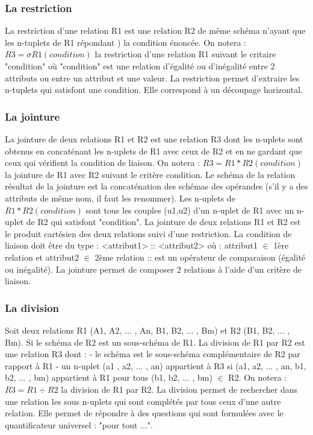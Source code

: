 \documentclass[12pt, a4paper, oneside, titlepage]{book}%
\begin{document}
\subsubsection{La restriction}
La restriction d'une relation R1 est une relation R2 de même schéma n'ayant que les n-tuplets de R1 répondant ) la condition énoncée.
On notera : $R3 = \sigma R1 (condition)$ la restriction d'une relation R1 suivant le critaire "condition" où "condition" est une relation d'égalité ou d'inégalité entre 2 attributs ou entre un attribut et une valeur.
La restriction permet d'extraire les n-tuplets qui satisfont une condition. Elle correspond à un découpage horizontal.

\subsubsection{La jointure}
La jointure de deux relations R1 et R2 est une relation R3 dont les n-uplets sont obtenus en concaténant les n-uplets de R1 avec ceux de R2 et en ne gardant que ceux qui vérifient la condition de liaison.
On notera : $R3 = R1 \ast  R2 (condition)$ la jointure de R1 avec R2 suivant le critère condition. Le schéma de la relation résultat de la jointure est la concaténation des schémas des opérandes (s'il y a des attributs de même nom, il faut les renommer).  Les n-uplets de $R1 \ast R2 (condition)$ sont tous les couples (u1,u2) d'un n-uplet de R1 avec un n-uplet de R2 qui satisfont "condition". La jointure de deux relations R1 et R2 est le produit cartésien des deux relations suivi d'une restriction. La condition de liaison doit être du type : <attribut1>  ::  <attribut2> où :  attribut1 $\in$ 1ère relation et attribut2 $\in$ 2ème relation :: est un opérateur de comparaison (égalité ou inégalité). La jointure permet de composer 2 relations à l'aide d'un critère de liaison.


\subsubsection{La division}
Soit deux relations R1 (A1, A2, ... , An, B1, B2, ... , Bm) et R2 (B1, B2, ... , Bm).
Si le schéma de R2 est un sous-schéma de R1. La division de R1 par R2 est une relation R3 dont :
-  le schéma est le sous-schéma complémentaire de R2 par rapport à R1
-  un n-uplet (a1 , a2, ... , an) appartient à R3 si (a1, a2, ... , an, b1, b2, ... , bm) appartient à R1 pour tous (b1, b2, ... , bm) $\in$ R2.
On notera : $R3 = R1 \div  R2$ la division de R1 par R2. La division permet de rechercher dans une relation les sous n-uplets qui sont complétés par tous ceux d'une autre relation. Elle permet de répondre à des questions qui sont formulées avec le quantificateur universel : "pour tout ...".
\end{document}
